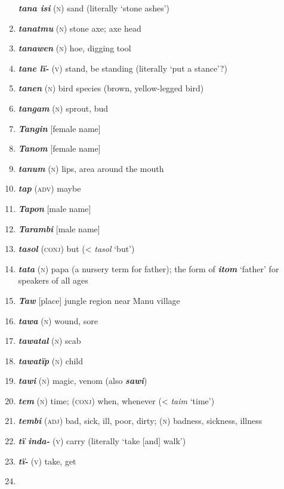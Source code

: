 \begin{enumerate}[noitemsep, label={}, align=left, widest=190, labelsep=1ex,leftmargin=*,itemindent=-10pt]
\textbf{\textit{tana isi}} (\textsc{n}) sand (literally ‘stone ashes’) \item 
\textbf{\textit{tanatmu}} (\textsc{n}) stone axe; axe head \item 
\textbf{\textit{tanawen}} (\textsc{n}) hoe, digging tool \item 
\textbf{\textit{tane lï-}} (\textsc{v}) stand, be standing (literally ‘put a stance’?) \item 
\textbf{\textit{tanen}} (\textsc{n}) bird species (brown, yellow-legged bird) \item 
\textbf{\textit{tangam}} (\textsc{n}) sprout, bud \item 
\textbf{\textit{Tangin}} [female name] \item 
\textbf{\textit{Tanom}} [female name] \item 
\textbf{\textit{tanum}} (\textsc{n}) lips, area around the mouth \item 
\textbf{\textit{tap}} (\textsc{adv)} maybe \item 
\textbf{\textit{Tapon}} [male name] \item 
\textbf{\textit{Tarambi}} [male name] \item 
\textbf{\textit{tasol}} (\textsc{conj}) but (<  \textit{tasol} ‘but’) \item 
\textbf{\textit{tata}} (\textsc{n}) papa (a nursery term for father); the  form of \textbf{\textit{itom}} ‘father’ for speakers of all ages \item 
\textbf{\textit{Taw}} [place] jungle region near Manu village \item 
\textbf{\textit{tawa}} (\textsc{n}) wound, sore \item 
\textbf{\textit{tawatal}} (\textsc{n}) scab \item 
\textbf{\textit{tawatïp}} (\textsc{n}) child \item 
\textbf{\textit{tawi}} (\textsc{n}) magic, venom (also \textbf{\textit{sawi}}) \item 
\textbf{\textit{tem}} (\textsc{n}) time; (\textsc{conj}) when, whenever (<  \textit{taim} ‘time’) \item 
\textbf{\textit{tembi}} (\textsc{adj}) bad, sick, ill, poor, dirty; (\textsc{n}) badness, sickness, illness \item 
\textbf{\textit{tï inda-}} (\textsc{v}) carry (literally ‘take [and] walk’) \item 
\textbf{\textit{tï-}} (\textsc{v}) take, get \item 

\end{enumerate}

